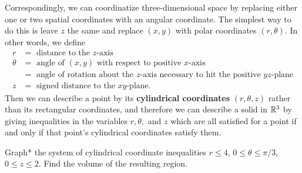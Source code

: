 \documentclass[svgnames]{report}
\begin{document}
Correspondingly, we can coordinatize three-dimensional space by
replacing either one or two spatial coordinates with an angular
coordinate. The simplest way to do this is leave $z$ the same and
replace $(x,y)$ with polar coordinates $(r,\theta)$. In other words,
we define
\begin{align*}
  r &= \text{ distance to the }z\text{-axis} \\
  \theta &= \text{ angle of } (x,y) \text{ with respect to positive
           }x\text{-axis} \\  &=
                                \text{ angle of rotation
                                about the }z\text{-axis necessary to hit the
                                positive }yz\text{-plane}  \\ 
  z &= \text{ signed distance to the }xy\text{-plane}. 
\end{align*}
Then we can describe a point by its \textbf{cylindrical coordinates}
$(r,\theta, z)$ rather than its rectangular coordinates, and therefore
we can describe a solid in $\mathbb{R}^3$ by giving inequalities in the
variables $r, \theta,$ and $z$ which are all satisfied for a point if
and only if that point's cylindrical coordinates satisfy them. 

\begin{example}{}{}
  Graph* the system of cylindrical coordinate inequalities $r \leq 4$,
  $0 \leq \theta \leq \pi/3$, $0 \leq z \leq 2$. Find the volume of
  the resulting region. 
\end{example}
\end{document}
